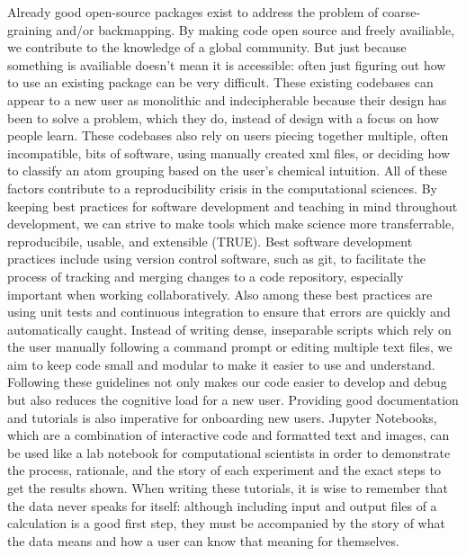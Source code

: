 Already good open-source packages exist to address the problem of coarse-graining and/or backmapping\cite{Marrink2007,Ruhle2009,Maerzke2011,MorphCT,Wassenaar2014b}. %
By making code open source and freely availiable, we contribute to the knowledge of a global community. 
But just because something is availiable doesn't mean it is accessible: often just figuring out how to use an existing package can be very difficult\cite{Cummings2019}.
These existing codebases can appear to a new user as monolithic and indecipherable because their design has been to solve a problem, which they do, instead of design with a focus on how people learn.
These codebases also rely on users piecing together multiple, often incompatible, bits of software, using manually created xml files, or deciding how to classify an atom grouping based on the user's chemical intuition.
All of these factors contribute to a reproducibility crisis in the computational sciences\cite{Baker2016}.
By keeping best practices for software development and teaching in mind throughout development, we can strive to make tools which make science more transferrable, reproducibile, usable, and extensible (TRUE)\cite{Thompson2020}. %
Best software development practices include using version control software, such as git, to facilitate the process of tracking and merging changes to a code repository, especially important when working collaboratively.
Also among these best practices are using unit tests and continuous integration to ensure that errors are quickly and automatically caught\cite{Wilson2014}.
Instead of writing dense, inseparable scripts which rely on the user manually following a command prompt or editing multiple text files, we aim to keep code small and modular to make it easier to use and understand\cite{Adorf2018a}.
Following these guidelines not only makes our code easier to develop and debug but also reduces the cognitive load for a new user\cite{Jankowski2019}.
Providing good documentation and tutorials is also imperative for onboarding new users.
Jupyter Notebooks, which are a combination of interactive code and formatted text and images, can be used like a lab notebook for computational scientists in order to demonstrate the process, rationale, and the story of each experiment and the exact steps to get the results shown\cite{Rule2019a}.
When writing these tutorials, it is wise to remember that the data never speaks for itself: although including input and output files of a calculation is a good first step, they must be accompanied by the story of what the data means and how a user can know that meaning for themselves\cite{SWC, Wilson2016}.

